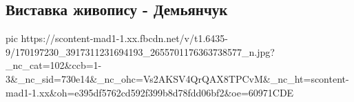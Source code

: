  
 
 
 
 

\subsection{Виставка живопису - Демьянчук}
\label{sec:07_04_2021.fb.ukrcentrmos.1.vystavka_demjanchuk}

\ifcmt
  pic https://scontent-mad1-1.xx.fbcdn.net/v/t1.6435-9/170197230_3917311231694193_2655701176363738577_n.jpg?_nc_cat=102&ccb=1-3&_nc_sid=730e14&_nc_ohc=Vs2AKSV4QrQAX8TPCvM&_nc_ht=scontent-mad1-1.xx&oh=e395df5762cd592f399b8d78fdd06bf2&oe=60971CDE
\fi

